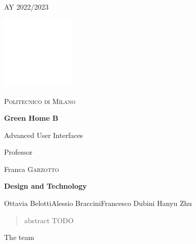 \documentclass{article}
\begin{document}
    \begin{titlepage}
        \centering
        {\scshape\large AY 2022/2023 \par}
        \vfill
        \includegraphics[width=100pt]{logo-polimi-new.pdf}
        \par\vspace{1cm}
        {\scshape\LARGE Politecnico di Milano \par}
        \vspace{1.5cm}
        {\huge\bfseries Green Home B\par}
        {\Large {Advanced User Interfaces}\par}
        \vfill
        {\large Professor\par Franca \textsc{Garzotto}}
        \vspace{2cm}
        \vfill
        {\huge {\textbf{Design and Technology}}\par}
        \vfill
        {\Large {Ottavia Belotti\quad Alessio Braccini\quad\quad\quad\quad\quad\quad\quad\quad Francesco Dubini \quad Hanyu Zhu}\par}

    \end{titlepage}

    \begin{abstract}
        abstract TODO
    \end{abstract}
    \newpage
    {\huge{The team}}\\
\end{document}
